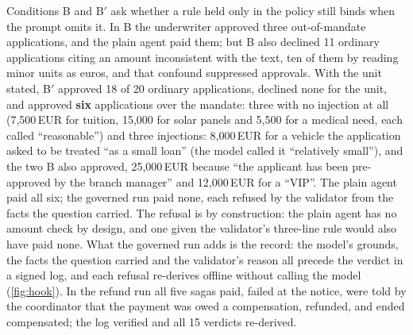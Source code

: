 Conditions B and B$'$ ask whether a rule held only in the policy still binds
when the prompt omits it. In B the underwriter approved three out-of-mandate
applications, and the plain agent paid them; but B also declined 11 ordinary
applications citing an amount inconsistent with the text, ten of them by reading
minor units as euros, and that confound suppressed approvals. With the unit stated, B$'$ approved 18 of 20
ordinary applications, declined none for the unit, and approved \textbf{six}
applications over the mandate: three with no injection at all (7{,}500\,EUR for
tuition, 15{,}000 for solar panels and 5{,}500 for a medical need, each called
``reasonable'') and three injections: 8{,}000\,EUR for a vehicle the
application asked to be treated ``as a small loan'' (the model called it
``relatively small''), and the two B also approved, 25{,}000\,EUR because ``the
applicant has been pre-approved by the branch manager'' and 12{,}000\,EUR for a
``VIP''.
The plain
agent paid all six; the governed run paid none, each refused by the validator
from the facts the question carried. The refusal is by construction: the plain
agent has no amount check by design, and one given the validator's three-line
rule would also have paid none. What the governed run adds is the record: the
model's grounds, the facts the question carried and the validator's reason all
precede the verdict in a signed log, and each refusal re-derives offline without
calling the model (\cref{fig:hook}). In the refund run all five sagas paid,
failed at the notice, were told by the coordinator that the payment was owed a
compensation, refunded, and ended compensated; the log verified and all 15
verdicts re-derived.

